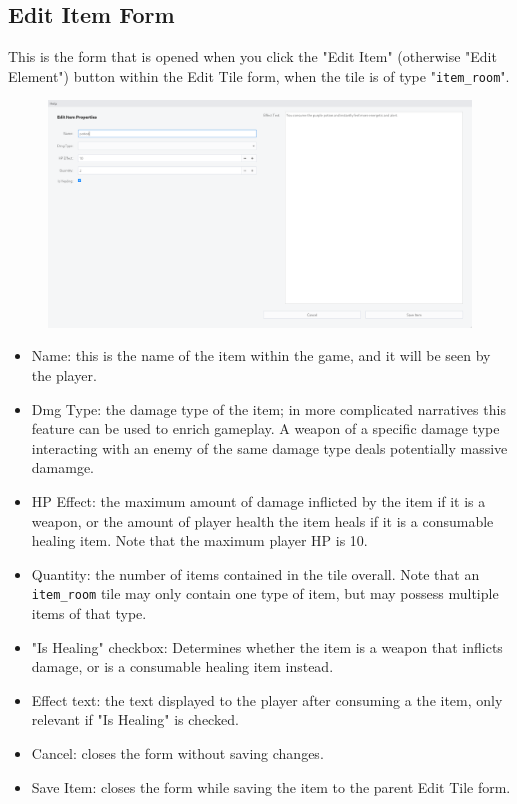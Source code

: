 \documentclass[class=article,crop=false]{standalone} \usepackage[margin=1in,headheight=57pt,headsep=0.1in]{geometry}
\begin{document}
\subsection{Edit Item Form}
This is the form that is opened when you click the "Edit Item" (otherwise "Edit Element") button within the Edit Tile form, when the tile is of type "\texttt{item\_room}".
\begin{figure}[H]
	\centering
	\includegraphics[width=1.0\textwidth]{./editItemForm.png}
\end{figure}
\begin{itemize}
	\item Name: this is the name of the item within the game, and it will be seen by the player.
	\item Dmg Type: the damage type of the item; in more complicated narratives this feature can be used to enrich gameplay. A weapon of a specific damage type interacting with an enemy of the same damage type deals potentially massive damamge.
	\item HP Effect: the maximum amount of damage inflicted by the item if it is a weapon, or the amount of player health the item heals if it is a consumable healing item. Note that the maximum player HP is 10.
	\item Quantity: the number of items contained in the tile overall. Note that an \texttt{item\_room} tile may only contain one type of item, but may possess multiple items of that type.
	\item "Is Healing" checkbox: Determines whether the item is a weapon that inflicts damage, or is a consumable healing item instead.
	\item Effect text: the text displayed to the player after consuming a the item, only relevant if "Is Healing" is checked.
	\item Cancel: closes the form without saving changes.
	\item Save Item: closes the form while saving the item to the parent Edit Tile form.
\end{itemize}
\end{document}
